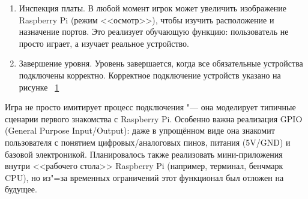 \begin{enumerate}
\begin{figure}[ht]
        \caption{Компьютер подключен верно}
        \label{fig:computerIsOn}
    \end{figure}
    При успешном соединении:
    \begin{itemize}
        \item Устройство <<фиксируется>> на порту,
        \item Проигрывается звуковой фидбек,
        \item Активируется визуальный эффект (например, монитор включается).
    \end{itemize}
    При ошибке "--- отображается подсказка, объект возвращается в коробку.
    \item Инспекция платы. В любой момент игрок может увеличить изображение Raspberry Pi (режим <<осмотр>>), чтобы изучить расположение и назначение портов. Это реализует обучающую функцию: пользователь не просто играет, а изучает реальное устройство.
    \item Завершение уровня. Уровень завершается, когда все обязательные устройства подключены корректно. Корректное подключение устройств указано на рисунке ~\ref{fig:computerIsOn}
\end{enumerate}
Игра не просто имитирует процесс подключения "--- она моделирует типичные сценарии первого знакомства с Raspberry Pi. Особенно важна реализация GPIO (General Purpose Input/Output): даже в упрощённом виде она знакомит пользователя с понятием цифровых/аналоговых пинов, питания (5V/GND) и базовой электроникой.
Планировалось также реализовать мини-приложения внутри <<рабочего стола>> Raspberry Pi (например, терминал, бенчмарк CPU), но из"=за временных ограничений этот функционал был отложен на будущее.